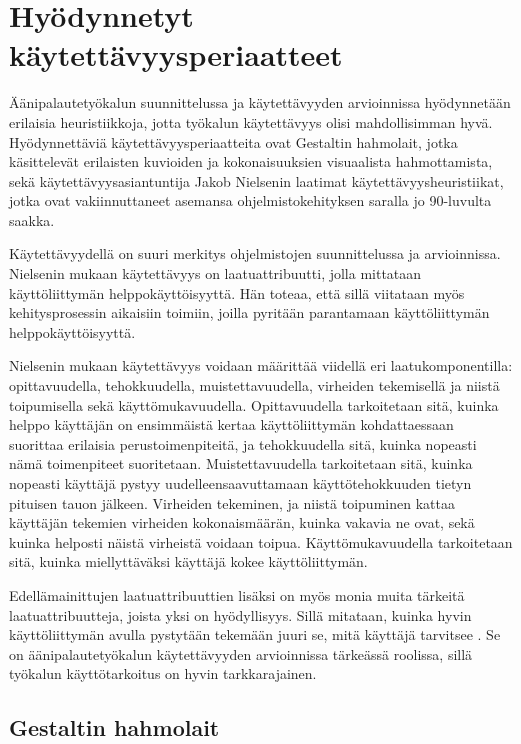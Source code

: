 \documentclass[utf8]{gradu3}
\begin{document}
\section{Hyödynnetyt käytettävyysperiaatteet}
\label{Kaytettavyysperiaatteet}


Äänipalautetyökalun suunnittelussa ja käytettävyyden arvioinnissa hyödynnetään erilaisia heuristiikkoja, jotta työkalun käytettävyys olisi mahdollisimman hyvä. Hyödynnettäviä käytettävyysperiaatteita ovat Gestaltin hahmolait, jotka käsittelevät erilaisten kuvioiden ja kokonaisuuksien visuaalista hahmottamista, sekä käytettävyysasiantuntija Jakob Nielsenin laatimat käytettävyysheuristiikat, jotka ovat vakiinnuttaneet asemansa ohjelmistokehityksen saralla jo 90-luvulta saakka.

Käytettävyydellä on suuri merkitys ohjelmistojen suunnittelussa ja arvioinnissa. Nielsenin mukaan \parencite*{intro-usability} käytettävyys on laatuattribuutti, jolla mittataan käyttöliittymän helppokäyttöisyyttä. Hän toteaa, että sillä viitataan myös kehitysprosessin aikaisiin toimiin, joilla pyritään parantamaan käyttöliittymän helppokäyttöisyyttä.

Nielsenin \parencite*{intro-usability} mukaan käytettävyys voidaan määrittää viidellä eri laatukomponentilla: opittavuudella, tehokkuudella, muistettavuudella, virheiden tekemisellä ja niistä toipumisella sekä käyttömukavuudella. Opittavuudella tarkoitetaan sitä, kuinka helppo käyttäjän on ensimmäistä kertaa käyttöliittymän kohdattaessaan suorittaa erilaisia perustoimenpiteitä, ja tehokkuudella sitä, kuinka nopeasti nämä toimenpiteet suoritetaan. Muistettavuudella tarkoitetaan sitä, kuinka nopeasti käyttäjä pystyy uudelleensaavuttamaan käyttötehokkuuden tietyn pituisen tauon jälkeen. Virheiden tekeminen, ja niistä toipuminen kattaa käyttäjän tekemien virheiden kokonaismäärän, kuinka vakavia ne ovat, sekä kuinka helposti näistä virheistä voidaan toipua. Käyttömukavuudella tarkoitetaan sitä, kuinka miellyttäväksi käyttäjä kokee käyttöliittymän.

Edellämainittujen laatuattribuuttien lisäksi on myös monia muita tärkeitä laatuattribuutteja, joista yksi on hyödyllisyys. Sillä mitataan, kuinka hyvin käyttöliittymän avulla pystytään tekemään juuri se, mitä käyttäjä tarvitsee \parencite{intro-usability}. Se on äänipalautetyökalun käytettävyyden arvioinnissa tärkeässä roolissa, sillä työkalun käyttötarkoitus on hyvin tarkkarajainen. 

\subsection{Gestaltin hahmolait}
\end{document}
